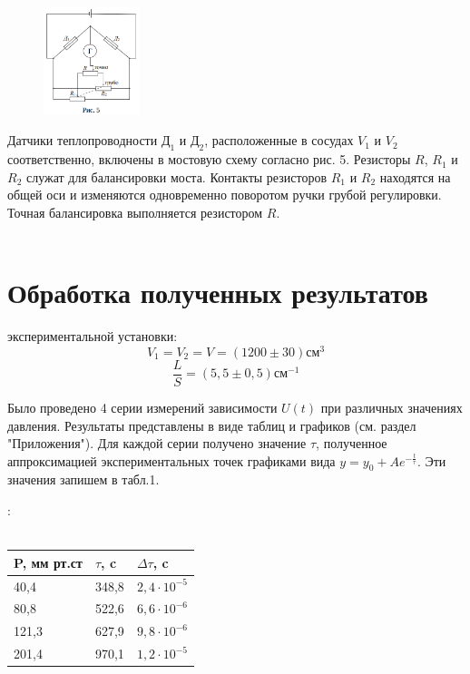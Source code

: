 \documentclass[15pt,a5paper,reqno]{article}
\begin{document}
    \begin{figure}
        \centering
        \includegraphics[width=0.25\textwidth]{Мост.PNG}
    \end{figure}
    
    Датчики теплопроводности $\text{Д}_1$ и $\text{Д}_2$, расположенные в сосудах $V_1$ и $V_2$ соответственно, включены в мостовую схему согласно рис. 5. Резисторы $R$, $R_1$ и $R_2$ служат для балансировки моста. Контакты резисторов $R_1$ и $R_2$ находятся на общей оси и изменяются одновременно поворотом ручки грубой регулировки. Точная балансировка выполняется резистором $R$.\\\\
	
\section{Обработка полученных результатов}

     экспериментальной установки:\\
    \[V_1 = V_2 = V = (1200 \pm 30)\text{см}^3\]
    \[\frac{L}{S} = (5,5 \pm 0,5)\text{см}^{-1}\]
    
    Было проведено 4 серии измерений зависимости $U(t)$ при различных значениях давления. Результаты представлены в виде таблиц и графиков (см. раздел "Приложения"). Для каждой серии получено значение $\tau$, полученное аппроксимацией экспериментальных точек графиками вида $y = y_0 + Ae^{-\frac{t}{\tau}}$. Эти значения запишем в табл.1.
    
    \newpage
    :\\
    \\
    \begin{tabular}{ | l | l | l | }
    \hline
    P, мм рт.ст & $\tau$, c & $\Delta\tau$, c  \\ \hline
    40,4 & 348,8 & $2,4\cdot10^{-5}$ \\ \hline
    80,8 & 522,6 & $6,6\cdot10^{-6}$  \\ \hline
    121,3 & 627,9 & $9,8\cdot10^{-6}$ \\ \hline
    201,4 & 970,1 & $1,2\cdot10^{-5}$ \\
    \hline
    \end{tabular}\\
    
\end{document}
